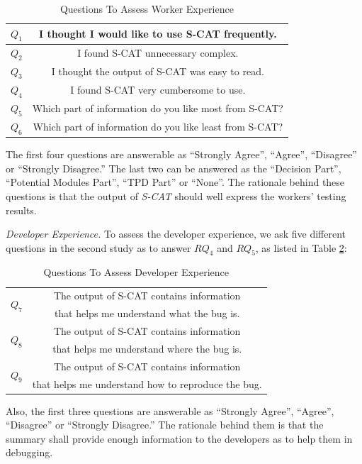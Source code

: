 \documentclass[10pt,conference]{IEEEtran}
\begin{document}
\begin{table}[!h]
\centering
\small
\caption{Questions To Assess Worker Experience}
\begin{tabular}{c|c} \hline
$Q_1$ & I thought I would like to use S-CAT frequently.\\ \hline
$Q_2$ &I found S-CAT unnecessary complex.\\ \hline
$Q_3$ & I thought the output of S-CAT was easy to read.\\ \hline
$Q_4$ & I found S-CAT very cumbersome to use.\\ \hline
$Q_5$ & Which part of information do you like most from S-CAT?\\ \hline
$Q_6$ & Which part of information do you like least from S-CAT?\\ \hline
 \end{tabular}
\label{tab:qworker}
\end{table}


The first four questions are answerable as ``Strongly Agree'', ``Agree'', ``Disagree'' or ``Strongly Disagree.'' The last two can be answered as
the ``Decision Part'', ``Potential Modules Part'', ``TPD Part'' or ``None''. The rationale behind these questions is that the output of \emph{S-CAT}
should well express the workers' testing results.


\emph{Developer Experience.} To assess the developer experience, we ask five different questions in the second study as to answer $RQ_4$ and $RQ_5$,
as listed in Table \ref{tab:qdeveloper}:

\begin{table}[!h]
\centering
\small
\caption{Questions To Assess Developer Experience}
\begin{tabular}{c|c} \hline
  \multirow{2}{*}{$Q_7$} & The output of S-CAT contains information\\ & that helps me understand what the bug is.\\\hline
  \multirow{2}{*}{$Q_8$} &The output of S-CAT contains information \\ & that helps me understand where the bug is.\\ \hline
  \multirow{2}{*}{$Q_9$} &The output of S-CAT contains information \\ & that helps me understand how to reproduce the bug.\\ \hline
\end{tabular}
\label{tab:qdeveloper}
\end{table}

Also, the first three questions are answerable as ``Strongly Agree'', ``Agree'', ``Disagree'' or ``Strongly Disagree.''
The rationale behind them is that the summary shall provide enough information to the developers as to help them in debugging.
\end{document}
